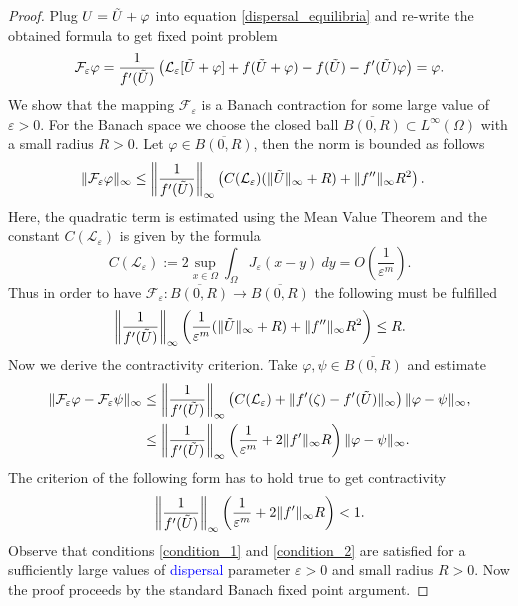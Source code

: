 \documentclass[12pt, a4paper]{article}
\theoremstyle{break}
\theoremstyle{break}
\theoremstyle{break}
\theoremstyle{break}
\theoremstyle{break}
\newcommand{\Leo}{\mathcal{L}_{\varepsilon}}
\begin{document}
\begin{proof}
    Plug $U = \Tilde{U} + \varphi$ into equation \eqref{dispersal_equilibria} and re-write the obtained formula to get fixed point problem
    $$\mathcal{F}_\varepsilon \varphi = \frac{1}{f'(\Tilde{U})}\left(\Leo [\Tilde{U} + \varphi] + f(\Tilde{U} + \varphi) - f(\Tilde{U}) - f'(\Tilde{U})\varphi\right) = \varphi.$$
    We show that the mapping $\mathcal{F}_\varepsilon$ is a Banach contraction for some large value of $\varepsilon > 0$. For the Banach space we choose the closed ball $\overline{B(0,R)} \subset L^\infty(\Omega)$ with a small radius $R > 0$.
    Let $\varphi \in \overline{B(0,R)}$, then the norm is bounded as follows
    \begin{align*}
        \|\mathcal{F}_\varepsilon \varphi \|_\infty
        &\leq \left\|\frac{1}{f'(\Tilde{U})}\right\|_\infty\left( C(\Leo)(\|\Tilde{U}\|_\infty  + R) +  \|f''\|_\infty R^2\right).
    \end{align*}
    Here, the quadratic term is estimated using the Mean Value Theorem and the constant $C(\Leo)$ is given by the formula
    $$C(\Leo) := 2 \sup_{x \in \Omega} \int_\Omega J_\varepsilon(x-y) \:dy = O(\frac{1}{\varepsilon^m}).$$ 
    Thus in order to have $\mathcal{F}_\varepsilon: \overline{B(0,R)} \rightarrow \overline{B(0,R)}$ the following must be fulfilled
    \begin{equation}
        \left\|\frac{1}{f'(\Tilde{U})}\right\|_\infty\left( \frac{1}{\varepsilon^m}(\|\Tilde{U}\|_\infty  + R) +  \|f''\|_\infty R^2\right) \leq R. \label{condition_1}
    \end{equation}
    Now we derive the contractivity criterion. Take $\varphi, \psi \in \overline{B(0,R)}$ and estimate
    \begin{align*}
        \|\mathcal{F}_\varepsilon \varphi - \mathcal{F}_\varepsilon \psi\|_\infty &\leq \left\|\frac{1}{f'(\Tilde{U})}\right\|_\infty \left( C(\Leo) + \|f'(\zeta) - f'(\Tilde{U})\|_\infty \right) \|\varphi - \psi\|_\infty, \\
        &\leq \left\| \frac{1}{f'(\Tilde{U})}\right\|_\infty\left( \frac{1}{\varepsilon^m} + 2\|f'\|_\infty R \right)\|\varphi - \psi\|_\infty.
    \end{align*}
    The criterion of the following form has to hold true to get contractivity
    \begin{equation}
        \left\| \frac{1}{f'(\Tilde{U})}\right\|_\infty\left( \frac{1}{\varepsilon^m} + 2\|f'\|_\infty R \right) < 1.
        \label{condition_2}
    \end{equation}
    Observe that conditions \eqref{condition_1} and \eqref{condition_2} are satisfied for a sufficiently large values of \textcolor{blue}{dispersal} parameter $\varepsilon > 0$ and small radius $R > 0$. Now the proof proceeds by the standard Banach fixed point argument.
\end{proof}
\end{document}
